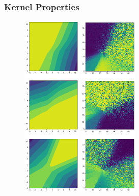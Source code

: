 \begin{frame}
\frametitle{Kernel Properties}

    \begin{figure}[h]
        \centering
\includegraphics[width=0.250\textwidth,
angle=90,origin=c]{c4_figures/kers_square.png}

\vspace{-3cm}

\includegraphics[width=0.250\textwidth,
angle=90,origin=c]{c4_figures/vars_square.png}
      \end{figure}
      \end{frame}

